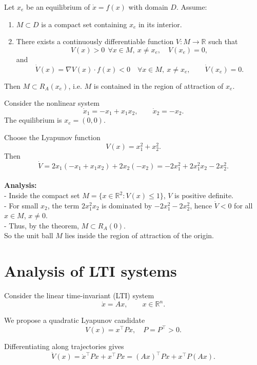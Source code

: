 
\begin{theorem}
Let $x_e$ be an equilibrium of $\dot{x}=f(x)$ with domain $D$.  
Assume:
\begin{enumerate}
    \item $M\subset D$ is a compact set containing $x_e$ in its interior.
    \item There exists a continuously differentiable function $V:M\to\mathbb{R}$ such that
    \[
    V(x)>0 \ \ \forall x\in M,\ x\neq x_e,\quad V(x_e)=0,
    \]
    and
    \[
    \dot V(x)=\nabla V(x)\cdot f(x) < 0 \quad \forall x\in M,\ x\neq x_e, \qquad \dot V(x_e)=0.
    \]
\end{enumerate}
Then $M\subset R_A(x_e)$, i.e. $M$ is contained in the region of attraction of $x_e$.
\end{theorem}


\begin{example}
Consider the nonlinear system
\[
\dot{x}_1=-x_1+x_1x_2, 
\qquad 
\dot{x}_2=-x_2.
\]
The equilibrium is $x_e=(0,0)$.

Choose the Lyapunov function
\[
V(x)=x_1^2+x_2^2.
\]
Then
\[
\dot V=2x_1(-x_1+x_1x_2)+2x_2(-x_2)=-2x_1^2+2x_1^2x_2-2x_2^2.
\]
\\
\textbf{Analysis:}  \\
- Inside the compact set $M=\{x\in\mathbb{R}^2: V(x)\leq 1\}$, $V$ is positive definite.  
\\- For small $x_2$, the term $2x_1^2x_2$ is dominated by $-2x_1^2-2x_2^2$, hence $\dot V<0$ for all $x\in M$, $x\neq 0$.  
\\- Thus, by the theorem, $M\subset R_A(0)$.
\\So the unit ball $M$ lies inside the region of attraction of the origin.
\end{example}

\section{Analysis of LTI systems}

Consider the linear time-invariant (LTI) system
\[
\dot x = A x,\qquad x\in\mathbb{R}^n.
\]

We propose a quadratic Lyapunov candidate
\[
V(x)=x^\top P x, \quad P=P^\top>0.
\]

Differentiating along trajectories gives
\[
\dot V(x) = \dot x^\top P x + x^\top P \dot x 
          = (A x)^\top P x + x^\top P (A x).
\]


